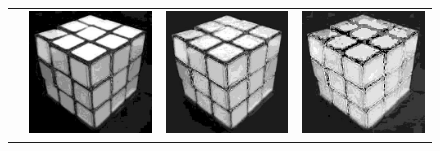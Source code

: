 \begin{figure}
\begin{tabular}{rccc}
         \raisebox{\raiselength}{Saturation} &
         \includegraphics[width=\rubiklength]{img/rubik/1_hsv_s.jpg} & 
         \includegraphics[width=\rubiklength]{img/rubik/2_hsv_s.jpg} & \includegraphics[width=\rubiklength]{img/rubik/3_hsv_s.jpg}\\
         

\end{tabular}
\end{figure}
